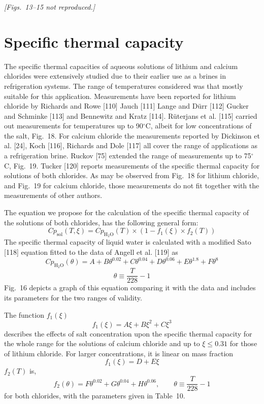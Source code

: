 \documentclass[11pt]{article}
\begin{document}
\textit{[Figs.~13--15 not reproduced.]}

\section{Specific thermal capacity}

The specific thermal capacities of aqueous solutions of lithium and calcium chlorides were
extensively studied due to their earlier use as a brines in refrigeration systems. The
range of temperatures considered was that mostly suitable for this application.
Measurements have been reported for lithium chloride by Richards and Rowe [110] Jauch
[111] Lange and D\"urr [112] Gucker and Schminke [113] and Bennewitz and Kratz [114].
R\"uterjans et al. [115] carried out measurements for temperatures up to 90$^{\circ}$C,
albeit for low concentrations of the salt, Fig.~18. For calcium chloride the measurements
reported by Dickinson et al. [24], Koch [116], Richards and Dole [117] all cover the range
of applications as a refrigeration brine. Ruckov [75] extended the range of measurements up
to 75$^{\circ}$C, Fig.~19. Tucker [120] reports measurements of the specific thermal
capacity for solutions of both chlorides. As may be observed from Fig.~18 for lithium
chloride, and Fig.~19 for calcium chloride, those measurements do not fit together with the
measurements of other authors.

The equation we propose for the calculation of the specific thermal capacity of the
solutions of both chlorides, has the following general form:
\begin{equation}
Cp_{\mathrm{sol}}(T,\xi) = Cp_{\mathrm{H_2O}}(T) \times \left(1 - f_1(\xi) \times
f_2(T)\right)
\end{equation}
The specific thermal capacity of liquid water is calculated with a modified Sato [118]
equation fitted to the data of Angell et al. [119] as
\begin{equation}
Cp_{\mathrm{H_2O}}(\theta) = A + B\theta^{0.02} + C\theta^{0.04} + D\theta^{0.06} +
E\theta^{1.8} + F\theta^{8}
\end{equation}
\begin{equation}
\theta \equiv \frac{T}{228} - 1
\end{equation}
Fig.~16 depicts a graph of this equation comparing it with the data and includes its
parameters for the two ranges of validity.

The function $f_1(\xi)$
\begin{equation}
f_1(\xi) = A\xi + B\xi^2 + C\xi^3
\end{equation}
describes the effects of salt concentration upon the specific thermal capacity for the
whole range for the solutions of calcium chloride and up to $\xi \le 0.31$ for those of
lithium chloride. For larger concentrations, it is linear on mass fraction
\begin{equation}
f_1(\xi) = D + E\xi
\end{equation}
$f_2(T)$ is,
\begin{equation}
f_2(\theta) = F\theta^{0.02} + G\theta^{0.04} + H\theta^{0.06}, \qquad
\theta \equiv \frac{T}{228} - 1
\end{equation}
for both chlorides, with the parameters given in Table~10.
\end{document}
